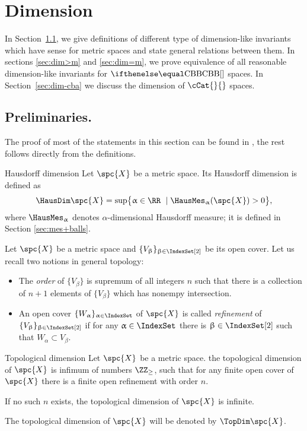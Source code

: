 \chapter{Dimension %
}

In Section~\ref{sec:prelim:dim}, we give definitions of different type of dimension-like invariants which have sense for metric spaces and state general relations between them.
In sections \ref{sec:dim>m} and \ref{sec:dim=m},
we prove equivalence of all reasonable dimension-like invariants for $\Alex{}$ spaces.
In Section~\ref{sec:dim-cba} we discuss the dimension of  $\cCat{}{}$ spaces.

\section{Preliminaries.}\label{sec:prelim:dim}

The proof of most of the statements in this section can be found in \cite{top-dim}, 
the rest follows directly from the definitions.

\begin{thm}{Hausdorff dimension}
\label{def:HausDim}
Let $\spc{X}$ be a metric space. 
Its Hausdorff dimension is defined as
\[\HausDim\spc{X}=\sup\bigl\{\alpha\in\RR\ \mid \HausMes_\alpha(\spc{X})>0\bigr\},\]
 where $\HausMes_\alpha$ denotes $\alpha$-dimensional Hausdorff measure;
it is defined in Section \ref{sec:mes+balls}.
\end{thm}

Let $\spc{X}$ be a metric space and $\{V_\beta\}_{\beta\in\IndexSet[2]}$
 be its open cover.
Let us recall two notions in general topology:
\begin{itemize}
\item The \emph{order} of $\{V_\beta\}$ is supremum of all integers $n$ such that there is a collection of $n+1$ elements of $\{V_\beta\}$ which has nonempy intersection.
\item An open cover $\{W_\alpha\}_{\alpha\in\IndexSet}$ of $\spc{X}$ is called \emph{refinement} of  $\{V_\beta\}_{\beta\in\IndexSet[2]}$ if for any $\alpha\in\IndexSet$ there is $\beta\in\IndexSet[2]$ such that $W_\alpha\subset V_\beta$.
\end{itemize}

\begin{thm}{Topological dimension}
\label{def:TopDim}
Let $\spc{X}$ be a metric space. 
the topological dimension of $\spc{X}$ is infimum of numbers $\ZZ_{\ge}$, 
such that for any finite open cover of $\spc{X}$ there is a finite open refinement with order $n$.

If no such $n$ exists, the topological dimension of $\spc{X}$ is infinite.

The topological dimension of $\spc{X}$ will be denoted by $\TopDim\spc{X}$.
\end{thm}

